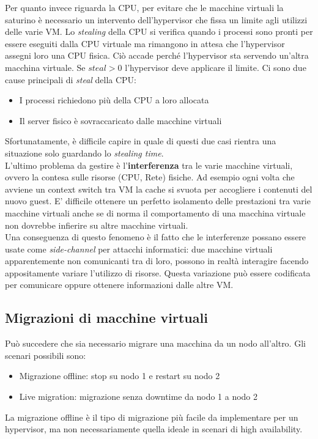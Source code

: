 \documentclass{article}
\begin{document}
		Per quanto invece riguarda la CPU, per evitare che le macchine virtuali la saturino è necessario un intervento dell'hypervisor che fissa un limite agli utilizzi delle varie VM. 
		Lo \textit{stealing} della CPU si verifica quando i processi sono pronti per essere eseguiti dalla CPU virtuale ma rimangono in attesa che l'hypervisor assegni loro una CPU fisica. Ciò accade perché l'hypervisor sta servendo un'altra macchina virtuale.
		Se $steal > 0$ l'hypervisor deve applicare il limite.
		Ci sono due cause principali di \emph{steal} della CPU:
		\begin{itemize}
		    \item I processi richiedono più della CPU a loro allocata
		    \item Il server fisico è sovraccaricato dalle macchine virtuali
		\end{itemize}
		Sfortunatamente, è difficile capire in quale di questi due casi rientra una situazione solo guardando lo \emph{stealing time}.\\
		
		L'ultimo problema da gestire è l'\textbf{interferenza} tra le varie macchine virtuali, ovvero la contesa sulle risorse (CPU, Rete) fisiche. Ad esempio ogni volta che avviene un context switch tra VM la cache si svuota per accogliere i contenuti del nuovo guest. E' difficile ottenere un perfetto isolamento delle prestazioni tra varie macchine virtuali anche se di norma il comportamento di una macchina virtuale non dovrebbe infierire su altre macchine virtuali.\\
		Una conseguenza di questo fenomeno è il fatto che le interferenze possano essere usate come \emph{side-channel} per attacchi informatici: due macchine virtuali apparentemente non comunicanti tra di loro, possono in realtà interagire facendo appositamente variare l’utilizzo di risorse. Questa variazione può essere codificata per comunicare oppure ottenere informazioni dalle altre VM.
		
		\subsection{Migrazioni di macchine virtuali}
		Può succedere che sia necessario migrare una macchina da un nodo all’altro. Gli scenari possibili sono:
		\begin{itemize}
			\item Migrazione offline: stop su nodo 1 e restart su nodo 2
			\item Live migration: migrazione senza downtime da nodo 1 a nodo 2
		\end{itemize}
		La migrazione offline è il tipo di migrazione più facile da implementare per un
		hypervisor, ma non necessariamente quella ideale in scenari di high availability.
		
\end{document}
